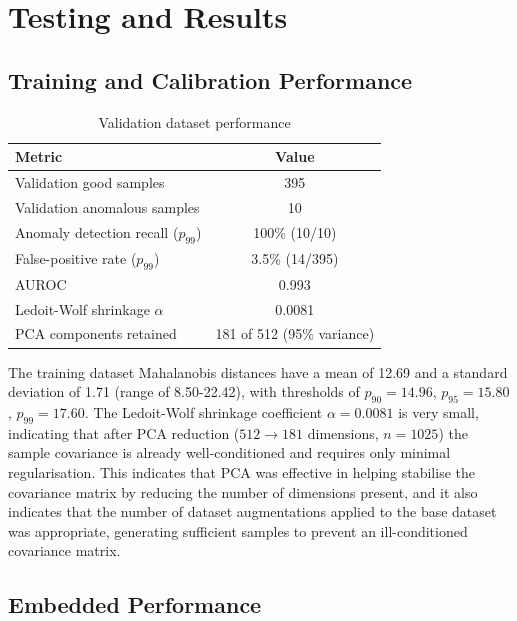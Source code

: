 \documentclass[conference]{IEEEtran}
\begin{document}
\section{Testing and Results}
\subsection{Training and Calibration Performance}

\begin{table}[h]
\centering
\caption{Validation dataset performance}
\label{tab:val}
\small
\renewcommand{\arraystretch}{1.5}
\begin{tabular}{lc}
\hline
\textbf{Metric} & \textbf{Value} \\
\hline
Validation good samples                & 395 \\
Validation anomalous samples           & 10 \\
Anomaly detection recall ($p_{99}$)    & 100\% (10/10) \\
False-positive rate ($p_{99}$)         & 3.5\% (14/395) \\
AUROC                                  & 0.993 \\
Ledoit-Wolf shrinkage $\alpha$        & 0.0081 \\
PCA components retained                & 181 of 512 (95\% variance) \\
\hline
\end{tabular}
\end{table}

The training dataset Mahalanobis distances have a mean of 12.69 and a standard deviation of 1.71 (range of 8.50-22.42), with thresholds of  $p_{90} = 14.96$, $p_{95} = 15.80$, $p_{99} = 17.60$. The Ledoit-Wolf shrinkage coefficient $\alpha=0.0081$ is very small, indicating that after PCA reduction ($512\rightarrow181$ dimensions, $n=1025$) the sample covariance is already well-conditioned and requires only minimal regularisation. This indicates that PCA was effective in helping stabilise the covariance matrix by reducing the number of dimensions present, and it also indicates that the number of dataset augmentations applied to the base dataset was appropriate, generating sufficient samples to prevent an ill-conditioned covariance matrix.

\subsection{Embedded Performance}
\end{document}
